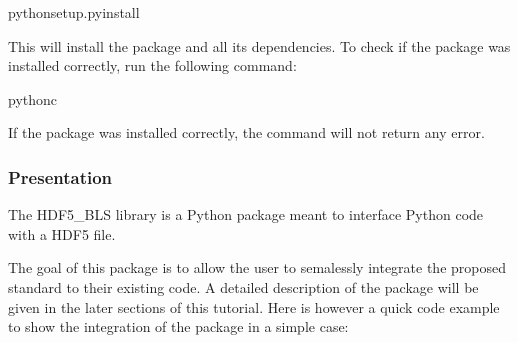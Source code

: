 \documentclass[letterpaper,10pt,english]{sphinxmanual}
\begin{document}
\begin{sphinxVerbatim}[commandchars=\\\{\}]
pythonsetup.pyinstall
\end{sphinxVerbatim}

\sphinxAtStartPar
This will install the package and all its dependencies. To check if the package was installed correctly, run the following command:

\begin{sphinxVerbatim}[commandchars=\\\{\}]
python\PYGZhy{}c
\end{sphinxVerbatim}

\sphinxAtStartPar
If the package was installed correctly, the command will not return any error.


\subsubsection{Presentation}
\label{\detokenize{source/hdf5_bls_package:presentation}}
\sphinxAtStartPar
The HDF5\_BLS library is a Python package meant to interface Python code with a HDF5 file.

\sphinxAtStartPar
The goal of this package is to allow the user to semalessly integrate the proposed standard to their existing code. A detailed description of the package will be given in the later sections of this tutorial. Here is however a quick code example to show the integration of the package in a simple case:
\end{document}
